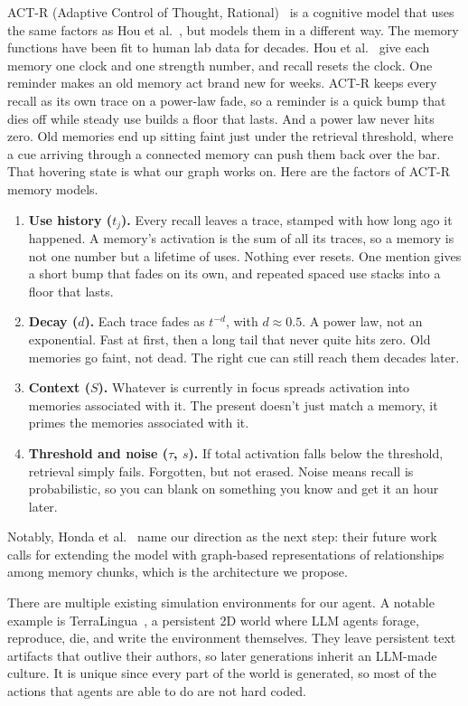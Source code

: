 \documentclass[11pt]{article}
\begin{document}
ACT-R (Adaptive Control of Thought, Rational)~\cite{honda2025} is a cognitive model that uses the same factors as Hou et al.~\cite{hou2024}, but models them in a different way. The memory functions have been fit to human lab data for decades. Hou et al.~\cite{hou2024} give each memory one clock and one strength number, and recall resets the clock. One reminder makes an old memory act brand new for weeks. ACT-R keeps every recall as its own trace on a power-law fade, so a reminder is a quick bump that dies off while steady use builds a floor that lasts. And a power law never hits zero. Old memories end up sitting faint just under the retrieval threshold, where a cue arriving through a connected memory can push them back over the bar. That hovering state is what our graph works on. Here are the factors of ACT-R memory models.

\begin{enumerate}
  \item \textbf{Use history ($t_j$).} Every recall leaves a trace, stamped with how long ago it happened. A memory's activation is the sum of all its traces, so a memory is not one number but a lifetime of uses. Nothing ever resets. One mention gives a short bump that fades on its own, and repeated spaced use stacks into a floor that lasts.
  \item \textbf{Decay ($d$).} Each trace fades as $t^{-d}$, with $d \approx 0.5$. A power law, not an exponential. Fast at first, then a long tail that never quite hits zero. Old memories go faint, not dead. The right cue can still reach them decades later.
  \item \textbf{Context ($S$).} Whatever is currently in focus spreads activation into memories associated with it. The present doesn't just match a memory, it primes the memories associated with it.
  \item \textbf{Threshold and noise ($\tau$, $s$).} If total activation falls below the threshold, retrieval simply fails. Forgotten, but not erased. Noise means recall is probabilistic, so you can blank on something you know and get it an hour later.
\end{enumerate}

Notably, Honda et al.~\cite{honda2025} name our direction as the next step: their future work calls for extending the model with graph-based representations of relationships among memory chunks, which is the architecture we propose.

There are multiple existing simulation environments for our agent. A notable example is TerraLingua~\cite{paolo2026}, a persistent 2D world where LLM agents forage, reproduce, die, and write the environment themselves. They leave persistent text artifacts that outlive their authors, so later generations inherit an LLM-made culture. It is unique since every part of the world is generated, so most of the actions that agents are able to do are not hard coded.
\end{document}
